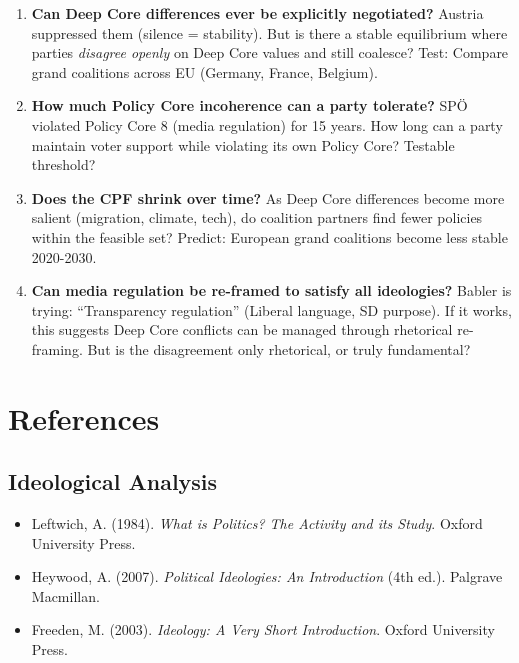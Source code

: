 \begin{enumerate}

\item \textbf{Can Deep Core differences ever be explicitly negotiated?} Austria suppressed them (silence = stability). But is there a stable equilibrium where parties \textit{disagree openly} on Deep Core values and still coalesce? Test: Compare grand coalitions across EU (Germany, France, Belgium).

\item \textbf{How much Policy Core incoherence can a party tolerate?} SPÖ violated Policy Core 8 (media regulation) for 15 years. How long can a party maintain voter support while violating its own Policy Core? Testable threshold?

\item \textbf{Does the CPF shrink over time?} As Deep Core differences become more salient (migration, climate, tech), do coalition partners find fewer policies within the feasible set? Predict: European grand coalitions become less stable 2020-2030.

\item \textbf{Can media regulation be re-framed to satisfy all ideologies?} Babler is trying: ``Transparency regulation'' (Liberal language, SD purpose). If it works, this suggests Deep Core conflicts can be managed through rhetorical re-framing. But is the disagreement only rhetorical, or truly fundamental?

\end{enumerate}


\section{References}
\label{sec:ck-references}

\subsection{Ideological Analysis}

\begin{itemize}[nosep]
\item Leftwich, A. (1984). \textit{What is Politics? The Activity and its Study}. Oxford University Press.

\item Heywood, A. (2007). \textit{Political Ideologies: An Introduction} (4th ed.). Palgrave Macmillan.

\item Freeden, M. (2003). \textit{Ideology: A Very Short Introduction}. Oxford University Press.

\end{itemize}

